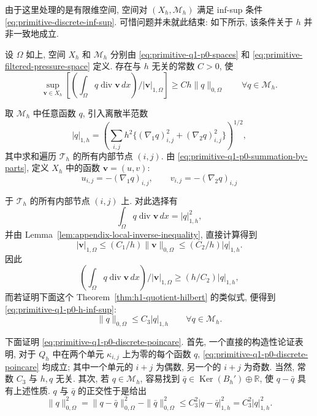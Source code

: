 由于这里处理的是有限维空间, 空间对 $(X_h,\mathcal M_h)$ 满足 inf-sup 条件
\eqref{eq:primitive-discrete-inf-sup}. 可惜问题并未就此结束: 如下所示,
该条件关于 $h$ 并非一致地成立.

\setcounter{statement}{4}
\renewcommand{\theHstatement}{lemma.\thesection.\arabic{statement}}
\begin{Lemma}\label{lem:primitive-q1-p0-degenerate-inf-sup}
设 $\Omega$ 如上, 空间 $X_h$ 和 $\mathcal M_h$ 分别由
\eqref{eq:primitive-q1-p0-spaces} 和
\eqref{eq:primitive-filtered-pressure-space} 定义. 存在与 $h$ 无关的常数 $C>0$, 使
\begin{equation}\label{eq:primitive-q1-p0-h-inf-sup}
\sup_{\mathbf v\in X_h}
\left[\left(\int_\Omega q\operatorname{div}\mathbf v\,dx\right)
/|\mathbf v|_{1,\Omega}\right]
\geq Ch\|q\|_{0,\Omega}
\qquad\forall q\in\mathcal M_h.
\end{equation}
\end{Lemma}

\begin{Proof}
取 $\mathcal M_h$ 中任意函数 $q$, 引入离散半范数
\begin{equation}\label{eq:primitive-q1-p0-discrete-seminorm}
|q|_{1,h}=\left(\sum_{i,j}h^2
\{(\nabla_1q)_{i,j}^2+(\nabla_2q)_{i,j}^2\}\right)^{1/2},
\end{equation}
其中求和遍历 $\mathcal T_h$ 的所有内部节点 $(i,j)$. 由
\eqref{eq:primitive-q1-p0-summation-by-parts}, 定义 $X_h$ 中的函数
$\mathbf v=(u,v)$:
\[
u_{i,j}=-(\nabla_1q)_{i,j},
\qquad v_{i,j}=-(\nabla_2q)_{i,j}
\]

于 $\mathcal T_h$ 的所有内部节点 $(i,j)$ 上. 对此选择有
\[
\int_\Omega q\operatorname{div}\mathbf v\,dx=|q|_{1,h}^2,
\]
并由 Lemma~\ref{lem:appendix-local-inverse-inequality}, 直接计算得到
\[
|\mathbf v|_{1,\Omega}
\leq(C_1/h)\|\mathbf v\|_{0,\Omega}
\leq(C_2/h)|q|_{1,h}.
\]
因此
\[
\left(\int_\Omega q\operatorname{div}\mathbf v\,dx\right)
/|\mathbf v|_{1,\Omega}
\geq(h/C_2)|q|_{1,h},
\]
而若证明下面这个 Theorem~\ref{thm:h1-quotient-hilbert} 的类似式,
便得到 \eqref{eq:primitive-q1-p0-h-inf-sup}:
\begin{equation}\label{eq:primitive-q1-p0-discrete-poincare}
\|q\|_{0,\Omega}\leq C_3|q|_{1,h}
\qquad\forall q\in\mathcal M_h.
\end{equation}

下面证明 \eqref{eq:primitive-q1-p0-discrete-poincare}. 首先, 一个直接的构造性论证表明,
对于 $Q_h$ 中在两个单元 $\kappa_{i,j}$ 上为零的每个函数 $q$,
\eqref{eq:primitive-q1-p0-discrete-poincare} 均成立; 其中一个单元的 $i+j$ 为偶数,
另一个的 $i+j$ 为奇数. 当然, 常数 $C_3$ 与 $h,q$ 无关. 其次,
若 $q\in\mathcal M_h$, 容易找到 $\bar q\in\operatorname{Ker}(B_h')\oplus\mathbb R$,
使 $q-\bar q$ 具有上述性质. $q$ 与 $\bar q$ 的正交性于是给出
\[
\|q\|_{0,\Omega}^2
=\|q-\bar q\|_{0,\Omega}^2-\|\bar q\|_{0,\Omega}^2
\leq C_3^2|q-\bar q|_{1,h}^2=C_3^2|q|_{1,h}^2.
\]
\end{Proof}

